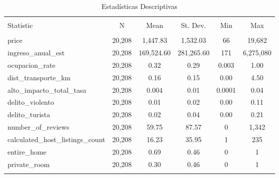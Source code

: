 
\begin{table}[!htbp] \centering 
  \caption{Estadísticas Descriptivas} 
  \label{} 
\begin{tabular}{@{\extracolsep{5pt}}lccccc} 
\\[-1.8ex]\hline 
\hline \\[-1.8ex] 
Statistic & \multicolumn{1}{c}{N} & \multicolumn{1}{c}{Mean} & \multicolumn{1}{c}{St. Dev.} & \multicolumn{1}{c}{Min} & \multicolumn{1}{c}{Max} \\ 
\hline \\[-1.8ex] 
price & 20,208 & 1,447.83 & 1,532.03 & 66 & 19,682 \\ 
ingreso\_anual\_est & 20,208 & 169,524.60 & 281,265.60 & 171 & 6,275,080 \\ 
ocupacion\_rate & 20,208 & 0.32 & 0.29 & 0.003 & 1.00 \\ 
dist\_transporte\_km & 20,208 & 0.16 & 0.15 & 0.00 & 4.50 \\ 
alto\_impacto\_total\_tasa & 20,208 & 0.004 & 0.01 & 0.0001 & 0.04 \\ 
delito\_violento & 20,208 & 0.01 & 0.02 & 0.00 & 0.11 \\ 
delito\_turista & 20,208 & 0.02 & 0.04 & 0.00 & 0.21 \\ 
number\_of\_reviews & 20,208 & 59.75 & 87.57 & 0 & 1,342 \\ 
calculated\_host\_listings\_count & 20,208 & 16.23 & 35.95 & 1 & 235 \\ 
entire\_home & 20,208 & 0.69 & 0.46 & 0 & 1 \\ 
private\_room & 20,208 & 0.30 & 0.46 & 0 & 1 \\ 
\hline \\[-1.8ex] 
\end{tabular} 
\end{table} 
